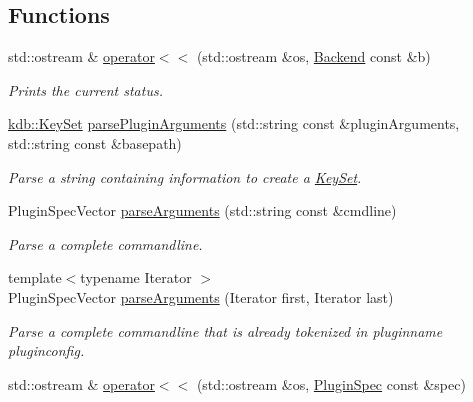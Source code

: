 \subsection*{Functions}
\begin{DoxyCompactItemize}
\item 
std\+::ostream \& \mbox{\hyperlink{namespacekdb_1_1tools_a10b59213ee542e33c7ecc481d4476a79}{operator$<$$<$}} (std\+::ostream \&os, \mbox{\hyperlink{classkdb_1_1tools_1_1Backend}{Backend}} const \&b)
\begin{DoxyCompactList}\small\item\em Prints the current status. \end{DoxyCompactList}\item 
\mbox{\hyperlink{classkdb_1_1KeySet}{kdb\+::\+Key\+Set}} \mbox{\hyperlink{namespacekdb_1_1tools_ad4fdf9477ede38a219b02a7442965f6d}{parse\+Plugin\+Arguments}} (std\+::string const \&plugin\+Arguments, std\+::string const \&basepath)
\begin{DoxyCompactList}\small\item\em Parse a string containing information to create a \mbox{\hyperlink{classkdb_1_1KeySet}{Key\+Set}}. \end{DoxyCompactList}\item 
Plugin\+Spec\+Vector \mbox{\hyperlink{namespacekdb_1_1tools_a3c08f8fdabc7002ff497b247cba6bb21}{parse\+Arguments}} (std\+::string const \&cmdline)
\begin{DoxyCompactList}\small\item\em Parse a complete commandline. \end{DoxyCompactList}\item 
{\footnotesize template$<$typename Iterator $>$ }\\Plugin\+Spec\+Vector \mbox{\hyperlink{namespacekdb_1_1tools_ab7ffe14ed9cab32c07ddb55a8a65973a}{parse\+Arguments}} (Iterator first, Iterator last)
\begin{DoxyCompactList}\small\item\em Parse a complete commandline that is already tokenized in pluginname pluginconfig. \end{DoxyCompactList}\item 
\mbox{\label{namespacekdb_1_1tools_a7a731fb15351e62222ae8763ca6aa876}} 
std\+::ostream \& \mbox{\hyperlink{namespacekdb_1_1tools_a7a731fb15351e62222ae8763ca6aa876}{operator$<$$<$}} (std\+::ostream \&os, \mbox{\hyperlink{classkdb_1_1tools_1_1PluginSpec}{Plugin\+Spec}} const \&spec)

\end{DoxyCompactItemize}
